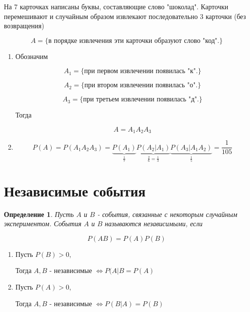 \documentclass[a4paper, 14pt]{report}
\newtheorem{defenition}{Определение}[chapter]
\begin{document}
На 7 карточках написаны буквы, составляющие слово "шоколад". Карточки перемешивают и случайным образом извлекают последовательно 3 карточки (без возвращения)

$$
A = \{ \text{в порядке извлечения эти карточки образуют слово "код".} \}
$$

\begin{enumerate}
    \item Обозначим

        $$
        A_1 = \{ \text{при первом извлечении появилась "к".} \}
        $$

        $$
        A_2 = \{ \text{при втором извлечении появилась "о".} \}
        $$

        $$
        A_3 = \{ \text{при третьем извлечении появилась "д".} \}
        $$

        Тогда

        $$
        A = A_1 A_2 A_3
        $$

    \item 
        $$
        P(A) = P(A_1A_2A_3) = \underbrace{P(A_1)}_{\frac{1}{7}} \underbrace{P(A_2|A_1)}_{\frac{2}{6} = \frac{1}{3}} \underbrace{P(A_3|A_1A_2)}_{\frac{1}{5}} = \frac{1}{105}
        $$

\end{enumerate}

\section{Независимые события}

\begin{defenition}
    Пусть $A$ и $B$ - события, связанные с некоторым случайным экспериментом. События $A$ и $B$ называются независимыми, если

    $$
    P(AB) = P(A)P(B)
    $$
\end{defenition}

\begin{theorem}
    \hfill

    \begin{enumerate}
        \item Пусть $P(B) > 0$,

            Тогда $A,B$ - независимые $\Leftrightarrow P(A|B = P(A)$

        \item Пусть $P(A) > 0$,

            Тогда $A,B$ - независимые $\Leftrightarrow P(B|A) = P(B)$
    \end{enumerate}
\end{theorem}
\end{document}
